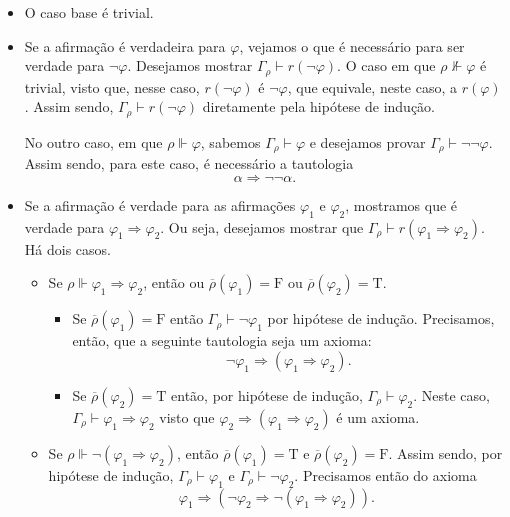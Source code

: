\documentclass{report}
\theoremstyle{definition}
\theoremstyle{remark}
\newcommand{\lt}{\mathrm{T}}
\newcommand{\lf}{\mathrm{F}}
\newcommand{\imply}{\mathbin{\Rightarrow}}
\begin{document}
	\begin{itemize}
	\item O caso base é trivial.
	
	\item Se a afirmação é verdadeira para $\varphi$, vejamos o que é necessário para ser verdade para $\neg \varphi$. Desejamos mostrar $\Gamma_\rho \vdash r(\neg \varphi)$. O caso em que $\rho \nVdash \varphi$ é trivial, visto que, nesse caso, $r(\neg \varphi)$ é $\neg \varphi$, que equivale, neste caso, a $r(\varphi)$. Assim sendo, $\Gamma_\rho \vdash r(\neg \varphi)$ diretamente pela hipótese de indução.
	
	No outro caso, em que $\rho \Vdash \varphi$, sabemos $\Gamma_\rho \vdash \varphi$ e desejamos provar $\Gamma_\rho \vdash \neg \neg \varphi$. Assim sendo, para este caso, é necessário a tautologia
	\[\alpha \imply \neg \neg \alpha.\]
	
	\item Se a afirmação é verdade para as afirmações $\varphi_1$ e $\varphi_2$, mostramos que é verdade para $\varphi_1 \imply \varphi_2$. Ou seja, desejamos mostrar que $\Gamma_\rho \vdash r(\varphi_1 \imply \varphi_2)$. Há dois casos.
	
	\begin{itemize}
	\item Se $\rho \Vdash \varphi_1 \imply \varphi_2$, então ou $\overline\rho(\varphi_1) = \lf$ ou $\overline\rho(\varphi_2) = \lt$.
	\begin{itemize}
	\item Se $\overline\rho(\varphi_1) = \lf$ então $\Gamma_\rho \vdash \neg \varphi_1$ por hipótese de indução. Precisamos, então, que a seguinte tautologia seja um axioma:
	\[\neg \varphi_1 \imply (\varphi_1 \imply \varphi_2).\]
	
	\item Se $\overline\rho(\varphi_2) = \lt$ então, por hipótese de indução, $\Gamma_\rho \vdash \varphi_2$. Neste caso, $\Gamma_\rho \vdash \varphi_1 \imply \varphi_2$ visto que $\varphi_2 \imply (\varphi_1 \imply \varphi_2)$ é um axioma.
	\end{itemize}
	
	\item Se $\rho \Vdash \neg (\varphi_1 \imply \varphi_2)$, então $\overline\rho(\varphi_1) = \lt$ e $\overline\rho(\varphi_2) = \lf$. Assim sendo, por hipótese de indução, $\Gamma_\rho \vdash \varphi_1$ e $\Gamma_\rho \vdash \neg \varphi_2$. Precisamos então do axioma
	\[\varphi_1 \imply (\neg \varphi_2 \imply \neg (\varphi_1 \imply \varphi_2)).\]
	\end{itemize}
	\end{itemize}
	
\end{document}
